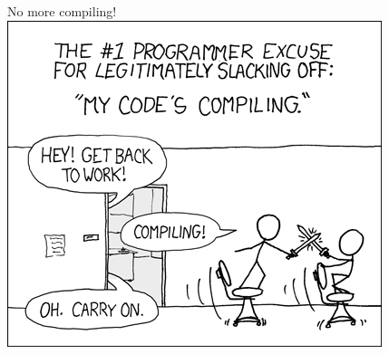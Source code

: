 \documentclass[11pt,professionalfonts]{beamer}
\begin{document}
\begin{frame}{No more compiling!}
    \centering
    \includegraphics[height=0.8\textheight, keepaspectratio,width=\textwidth]{figures/compiling.png}
\end{frame}
\end{document}
